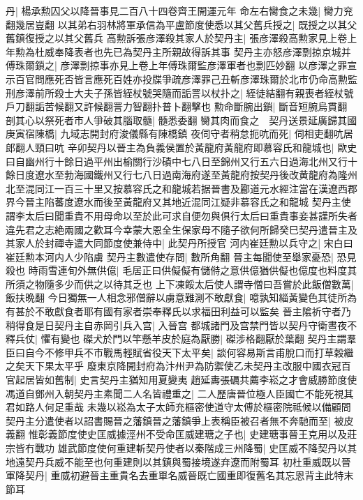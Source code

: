 丹|{
	楊承勲囚父以降晉事見二百八十四卷齊王開運元年}
命左右臠食之未幾|{
	臠力兖翻幾居豈翻}
以其弟右羽林將軍承信為平盧節度使悉以其父舊兵授之|{
	既授之以其父舊鎮復授之以其父舊兵}
高勲訴張彦澤殺其家人於契丹主|{
	張彦澤殺高勲家見上卷上年勲為杜威奉降表者也先已為契丹主所親故得訴其事}
契丹主亦怒彦澤剽掠京城并傅珠爾鎻之|{
	彦澤剽掠事亦見上卷上年傅珠爾監彦澤軍者也剽匹妙翻}
以彦澤之罪宣示百官問應死否皆言應死百姓亦投牒爭疏彦澤罪己丑斬彦澤珠爾於北市仍命高勲監刑彦澤前所殺士大夫子孫皆絰杖號哭隨而詬詈以杖扑之|{
	絰徒結翻有親喪者絰杖號戶刀翻詬苦候翻又許候翻詈力智翻扑普卜翻擊也}
勲命斷腕出鎖|{
	斷音短腕烏貫翻}
剖其心以祭死者市人爭破其腦取髓|{
	髓悉委翻}
臠其肉而食之　契丹送景延廣歸其國庚寅宿陳橋|{
	九域志開封府浚儀縣有陳橋鎮}
夜伺守者稍怠扼吭而死|{
	伺相吏翻吭居郎翻人頸曰吭}
辛卯契丹以晉主為負義侯置於黃龍府黃龍府即慕容氏和龍城也|{
	歐史曰自幽州行十餘日過平州出榆關行沙磧中七八日至錦州又行五六日過海北州又行十餘日度遼水至勃海國鐵州又行七八日過南海府遂至黃龍府按契丹後改黄龍府為隆州北至混同江一百三十里又按慕容氏之和龍城若据晉書及酈道元水經注當在漢遼西郡界今晉主陷蕃度遼水而後至黃龍府又其地近混同江疑非慕容氏之和龍城}
契丹主使謂李太后曰聞重貴不用母命以至於此可求自便勿與俱行太后曰重貴事妾甚謹所失者違先君之志絶兩國之歡耳今幸蒙大恩全生保家母不隨子欲何所歸癸巳契丹遣晉主及其家人於封禪寺遣大同節度使兼侍中|{
	此契丹所授官}
河内崔廷勲以兵守之|{
	宋白曰崔廷勲本河内人少陷虜}
契丹主數遣使存問|{
	數所角翻}
晉主每聞使至舉家憂恐|{
	恐見殺也}
時雨雪連旬外無供億|{
	毛居正曰供儗儗有儲偫之意供億猶供儗也億度也料度其所須之物隨多少而供之以待其乏也}
上下凍餒太后使人謂寺僧曰吾嘗於此飯僧數萬|{
	飯扶晩翻}
今日獨無一人相念邪僧辭以虜意難測不敢獻食|{
	噫孰知緇黃變色其徒所為有甚於不敢獻食者耶有國有家者崇奉釋氏以求福田利益可以監矣}
晉主隂祈守者乃稍得食是日契丹主自赤岡引兵入宫|{
	入晉宫}
都城諸門及宫禁門皆以契丹守衛晝夜不釋兵仗|{
	懼有變也}
磔犬於門以竿懸羊皮於庭為厭勝|{
	磔涉格翻厭於葉翻}
契丹主謂羣臣曰自今不修甲兵不市戰馬輕賦省役天下太平矣|{
	談何容易斯言甫脫口而打草穀繼之矣天下果太平乎}
廢東京降開封府為汴州尹為防禦使乙未契丹主改服中國衣冠百官起居皆如舊制|{
	史言契丹主猶知用夏變夷}
趙延夀張礪共薦李崧之才會威勝節度使馮道自鄧州入朝契丹主素聞二人名皆禮重之|{
	二人歷唐晉位極人臣國亡不能死視其君如路人何足重哉}
未幾以崧為太子太師充樞密使道守太傅於樞密院祗候以備顧問契丹主分遣使者以詔書賜晉之藩鎮晉之藩鎮爭上表稱臣被召者無不奔馳而至|{
	被皮義翻}
惟彰義節度使史匡威據涇州不受命匡威建瑭之子也|{
	史建瑭事晉王克用以及莊宗皆冇戰功}
雄武節度使何重建斬契丹使者以秦階成三州降蜀|{
	史匡威不降契丹以其地遠契丹兵威不能至也何重建則以其鎮與蜀接境遂弃遼而附蜀耳}
初杜重威既以晉軍降契丹|{
	重威初避晉主重貴名去重單名威晉既亡國重即復舊名其忘恩背主此特末節耳}
